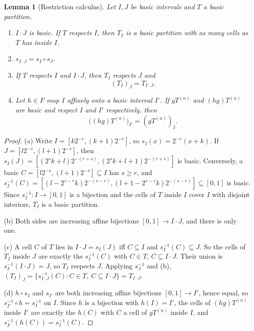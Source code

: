 \documentclass[11pt]{article}
\newtheorem{lemma}[theorem]{Lemma}
\theoremstyle{definition}
\numberwithin{equation}{section}
\begin{document}
\begin{lemma}[Restriction calculus]\label{dyad:calculus}
Let $I,J$ be basic intervals and $T$ a basic partition.
\begin{enumerate}[label=\textup{(\alph*)}]
\item $I\cdot J$ is basic. If $T$ respects $I$, then $T_I$ is a basic
 partition with as many cells as $T$ has inside $I$.
\item $s_{I\cdot J}=s_I\circ s_J$.
\item If $T$ respects $I$ and $I\cdot J$, then $T_I$ respects $J$ and
 \begin{equation}\label{dyad:restriction}
  (T_I)_J=T_{I\cdot J}.
 \end{equation}
\item Let $h\in F$ map $I$ affinely onto a basic interval $I'$. If
 $gT^{(n)}$ and $(hg)T^{(n)}$ are basic and respect $I$ and $I'$
 respectively, then
 \begin{equation}\label{dyad:covariance}
  \bigl((hg)T^{(n)}\bigr)_{I'}=(gT^{(n)})_I.
 \end{equation}
\end{enumerate}
\end{lemma}

\begin{proof}
(a) Write $I=[k2^{-r},(k+1)2^{-r}]$, so $s_I(x)=2^{-r}(x+k)$. If
$J=[l2^{-s},(l+1)2^{-s}]$, then
$s_I(J)=[(2^sk+l)2^{-(r+s)},(2^sk+l+1)2^{-(r+s)}]$ is basic. Conversely, a
basic $C=[l2^{-s},(l+1)2^{-s}]\subseteq I$ has $s\ge r$, and
$s_I^{-1}(C)=[(l-2^{s-r}k)2^{-(s-r)},(l+1-2^{s-r}k)2^{-(s-r)}]\subseteq[0,1]$
is basic. Since $s_I^{-1}:I\to[0,1]$ is a bijection and the cells of $T$
inside $I$ cover $I$ with disjoint interiors, $T_I$ is a basic partition.

(b) Both sides are increasing affine bijections $[0,1]\to I\cdot J$, and
there is only one.

(c) A cell $C$ of $T$ lies in $I\cdot J=s_I(J)$ iff $C\subseteq I$ and
$s_I^{-1}(C)\subseteq J$. So the cells of $T_I$ inside $J$ are exactly the
$s_I^{-1}(C)$ with $C\in T$, $C\subseteq I\cdot J$. Their union is
$s_I^{-1}(I\cdot J)=J$, so $T_I$ respects $J$. Applying $s_J^{-1}$ and (b),
$(T_I)_J=\{s_{I\cdot J}^{-1}(C):C\in T,\ C\subseteq I\cdot J\}=T_{I\cdot J}$.

(d) $h\circ s_I$ and $s_{I'}$ are both increasing affine bijections
$[0,1]\to I'$, hence equal, so $s_{I'}^{-1}\circ h=s_I^{-1}$ on $I$. Since
$h$ is a bijection with $h(I)=I'$, the cells of $(hg)T^{(n)}$ inside $I'$
are exactly the $h(C)$ with $C$ a cell of $gT^{(n)}$ inside $I$, and
$s_{I'}^{-1}(h(C))=s_I^{-1}(C)$.
\end{proof}
\end{document}
